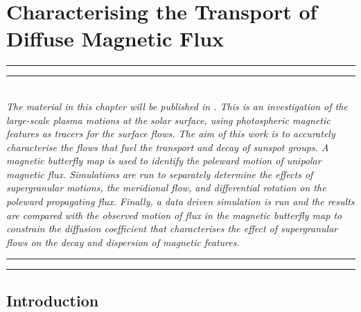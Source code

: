 

\chapter[Magnetic Flux Transport]{Characterising the Transport of Diffuse Magnetic Flux} %
\label{chapter:results_diffusion}



    \graphicspath{{7/figures/EPS/}{7/figures/}}

\glsresetall


\hrule height 1mm
\vspace{0.5mm}
\hrule height 0.4mm 
\noindent 
\\ {\it 
The material in this chapter will be published in \emph{}. This is an investigation of the large-scale plasma motions at the solar surface, using photospheric magnetic features as tracers for the surface flows. The aim of this work is to accurately characterise the flows that fuel the transport and decay of sunspot groups. A magnetic butterfly map is used to identify the poleward motion of unipolar magnetic flux. Simulations are run to separately determine the effects of supergranular motions, the meridional flow, and differential rotation on the poleward propagating flux. Finally, a data driven simulation is run and the results are compared with the observed motion of flux in the magnetic butterfly map to constrain the diffusion coefficient that characterises the effect of supergranular flows on the  decay and dispersion of magnetic features.
}
\\ 
\hrule height 0.4mm
\vspace{0.5mm}
\hrule height 1mm 
\vspace{1.5cm}

\section{Introduction}

